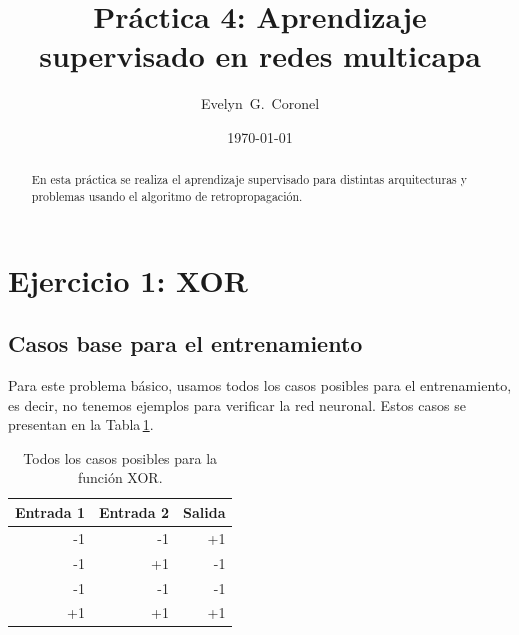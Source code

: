 



\title{Práctica 4: Aprendizaje supervisado en redes multicapa}
\author{Evelyn~G.~Coronel}


\date[]{\lowercase{\today}} %

\begin{abstract}
En esta práctica se realiza el aprendizaje supervisado para distintas arquitecturas y problemas usando el algoritmo de retropropagación.
\end{abstract} 
\maketitle
%

\section*{Ejercicio 1: XOR}

\subsection*{Casos base para el entrenamiento}

Para este problema básico, usamos todos los casos posibles para el entrenamiento, es decir, no tenemos ejemplos para verificar la red neuronal. Estos casos se presentan en la Tabla\,\ref{tab:xor}.

\begin{table}[H]
\centering
\begin{tabular}{r | r | r}
Entrada 1 & Entrada 2 & Salida 	\\ \hline
-1 		  &-1	& +1 \\
-1 		  &+1	& -1\\
-1 		  &-1	& -1\\
+1 		  &+1	& +1\\
\end{tabular}
\caption{Todos los casos posibles para la función XOR.} \label{tab:xor}
\end{table}

